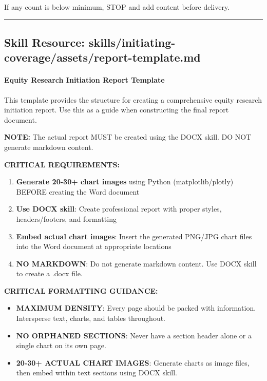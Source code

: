 \documentclass[11pt]{article}
\begin{document}
If any count is below minimum, STOP and add content before delivery.


\vspace{0.8em}\hrule\vspace{0.8em}

\subsection{Skill Resource: skills/initiating-coverage/assets/report-template.md}\label{file:skills-initiating-coverage-assets-report-template-md}

\paragraph{Equity Research Initiation Report Template}\mbox{}\par

This template provides the structure for creating a comprehensive equity research initiation report. Use this as a guide when constructing the final report document.


\textbf{NOTE:} The actual report MUST be created using the DOCX skill. DO NOT generate markdown content.


\textbf{CRITICAL REQUIREMENTS:}

\begin{enumerate}[leftmargin=*,itemsep=2pt,topsep=2pt]
\item {} \textbf{Generate 20-30+ chart images} using Python (matplotlib/plotly) BEFORE creating the Word document
\item {} \textbf{Use DOCX skill}: Create professional report with proper styles, headers/footers, and formatting
\item {} \textbf{Embed actual chart images}: Insert the generated PNG/JPG chart files into the Word document at appropriate locations
\item {} \textbf{NO MARKDOWN}: Do not generate markdown content. Use DOCX skill to create a .docx file.
\end{enumerate}

\textbf{CRITICAL FORMATTING GUIDANCE:}

\begin{itemize}[leftmargin=*,itemsep=2pt,topsep=2pt]
\item {} \textbf{MAXIMUM DENSITY}: Every page should be packed with information. Intersperse text, charts, and tables throughout.
\item {} \textbf{NO ORPHANED SECTIONS}: Never have a section header alone or a single chart on its own page.
\item {} \textbf{20-30+ ACTUAL CHART IMAGES}: Generate charts as image files, then embed within text sections using DOCX skill.
\end{itemize}
\end{document}
